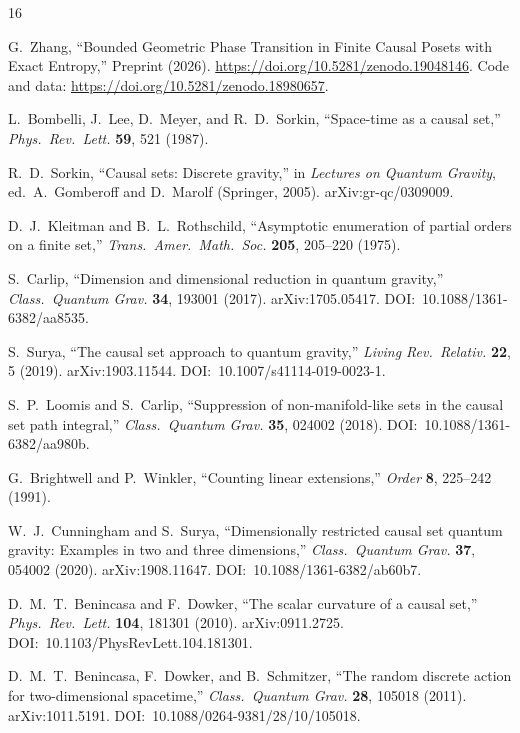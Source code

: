 \documentclass[11pt,a4paper]{article}
\begin{document}
\begin{thebibliography}{16}

G.~Zhang,
``Bounded Geometric Phase Transition in Finite Causal Posets with Exact Entropy,''
Preprint (2026). \url{https://doi.org/10.5281/zenodo.19048146}.
Code and data: \url{https://doi.org/10.5281/zenodo.18980657}.

L.~Bombelli, J.~Lee, D.~Meyer, and R.~D.~Sorkin,
``Space-time as a causal set,''
\textit{Phys.\ Rev.\ Lett.} \textbf{59}, 521 (1987).

R.~D.~Sorkin,
``Causal sets: Discrete gravity,''
in \textit{Lectures on Quantum Gravity}, ed.\ A.~Gomberoff and D.~Marolf
(Springer, 2005). arXiv:gr-qc/0309009.

D.~J.~Kleitman and B.~L.~Rothschild,
``Asymptotic enumeration of partial orders on a finite set,''
\textit{Trans.\ Amer.\ Math.\ Soc.} \textbf{205}, 205--220 (1975).

S.~Carlip,
``Dimension and dimensional reduction in quantum gravity,''
\textit{Class.\ Quantum Grav.} \textbf{34}, 193001 (2017).
arXiv:1705.05417. DOI:~10.1088/1361-6382/aa8535.

S.~Surya,
``The causal set approach to quantum gravity,''
\textit{Living Rev.\ Relativ.} \textbf{22}, 5 (2019).
arXiv:1903.11544. DOI:~10.1007/s41114-019-0023-1.

S.~P.~Loomis and S.~Carlip,
``Suppression of non-manifold-like sets in the causal set path integral,''
\textit{Class.\ Quantum Grav.} \textbf{35}, 024002 (2018).
DOI:~10.1088/1361-6382/aa980b.

G.~Brightwell and P.~Winkler,
``Counting linear extensions,''
\textit{Order} \textbf{8}, 225--242 (1991).

W.~J.~Cunningham and S.~Surya,
``Dimensionally restricted causal set quantum gravity: Examples in two and three dimensions,''
\textit{Class.\ Quantum Grav.} \textbf{37}, 054002 (2020).
arXiv:1908.11647. DOI:~10.1088/1361-6382/ab60b7.

D.~M.~T.~Benincasa and F.~Dowker,
``The scalar curvature of a causal set,''
\textit{Phys.\ Rev.\ Lett.} \textbf{104}, 181301 (2010).
arXiv:0911.2725. DOI:~10.1103/PhysRevLett.104.181301.

D.~M.~T.~Benincasa, F.~Dowker, and B.~Schmitzer,
``The random discrete action for two-dimensional spacetime,''
\textit{Class.\ Quantum Grav.} \textbf{28}, 105018 (2011).
arXiv:1011.5191. DOI:~10.1088/0264-9381/28/10/105018.


\end{thebibliography}
\end{document}
